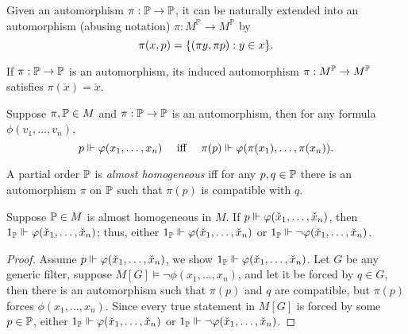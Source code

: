 \begin{definition} \label{defn:extend_automorphism_to_names}
    Given an automorphism \(\pi:\P\to\P\),
    it can be naturally extended into an automorphism (abusing notation) \(\pi: M^{\mathbb{P}} \to M^{\mathbb{P}}\) by
    \[ \pi(x,p) = \set{(\pi y , \pi p ): y\in x}. \]
\end{definition}

\begin{observation}
    If \(\pi:\P\to\P\) is an automorphism, its induced automorphism \(\pi: M^\P \to M^\P\) satisfies \(\pi(\check{x}) = \check{x}\).
\end{observation}

\begin{lemma} \label{lemma:forcing_invariant_under_pi}
    Suppose \(\pi, \P\in M\) and \(\pi:\P\to\P\) is an automorphism, then for any formula \(\phi(v_1,\dots,v_n)\),
    \[ p\forces \phi(x_1,\dots,x_n)\quad \text{ iff }\quad \pi(p)\forces \phi(\pi(x_1),\dots,\pi(x_n)).  \]
\end{lemma}

\begin{definition}
    A partial order \(\P\) is \emph{almost homogeneous} iff
    for any \(p,q\in\P\) there is an automorphism \(\pi\) on \(\P\) such that \(\pi(p)\) is compatible with \(q\).
\end{definition}

\begin{proposition} \label{proposition:property_almost_homo}
    Suppose \(\P\in M\) is almost homogeneous in \(M\).
    If \(p\forces \phi(\check{x}_1,\dots,\check{x}_n)\), then \(1_\P\forces \phi(\check{x}_1,\dots,\check{x}_n)\);
    thus, either \(1_\P\forces \phi(\check{x}_1,\dots,\check{x}_n)\) or \(1_\P\forces \lnot\phi(\check{x}_1,\dots,\check{x}_n)\).
\end{proposition}
\begin{proof}
    Assume \(p\forces \phi(\check{x}_1,\dots,\check{x}_n)\), we show \(1_\P\forces \phi(\check{x}_1,\dots,\check{x}_n)\).
    Let \(G\) be any generic filter, suppose \(M[G]\models \lnot\phi(x_1,\dots,x_n)\),
    and let it be forced by \(q\in G\), then there is an automorphism such that \(\pi(p)\) and \(q\) are compatible,
    but \(\pi(p)\) forces \(\phi(x_1,\dots,x_n)\).
    Since every true statement in \(M[G]\) is forced by some \(p\in\P\),
    either \(1_\P\forces \phi(\check{x}_1,\dots,\check{x}_n)\) or \(1_\P\forces \lnot\phi(\check{x}_1,\dots,\check{x}_n)\).
\end{proof}

